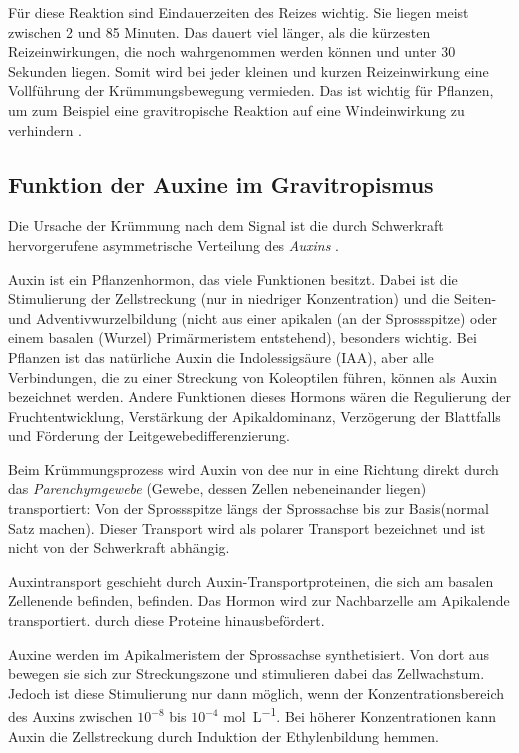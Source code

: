 \documentclass[
11pt, 
ngerman,
listof=totocnumbered,
oneside,
bibliography=totocnumbered,
abstracton
]{scrreprt}
\begin{document}
Für diese Reaktion sind Eindauerzeiten des Reizes wichtig. Sie liegen meist zwischen 2 und 85 Minuten. Das dauert viel länger, als die kürzesten Reizeinwirkungen, die noch wahrgenommen werden können und unter 30 Sekunden liegen. 
Somit wird bei jeder kleinen und kurzen Reizeinwirkung eine Vollführung der Krümmungsbewegung vermieden. Das ist wichtig für Pflanzen, um zum Beispiel eine gravitropische Reaktion auf eine Windeinwirkung zu verhindern \parencite[531]{Luettge}.


\subsection{Funktion der Auxine im Gravitropismus}

Die Ursache der Krümmung nach dem Signal ist die durch Schwerkraft hervorgerufene asymmetrische Verteilung des \emph{Auxins}  \parencite[502--503]{Nultsch}.

Auxin ist ein Pflanzenhormon, das viele Funktionen besitzt. Dabei ist die Stimulierung der Zellstreckung (nur in niedriger Konzentration) und die Seiten- und Adventivwurzelbildung (nicht aus einer apikalen (an der Sprossspitze) oder einem basalen (Wurzel) Primärmeristem entstehend), besonders wichtig. 
Bei Pflanzen ist das natürliche Auxin die Indolessigsäure (IAA), aber alle Verbindungen, die zu einer Streckung von Koleoptilen führen, können als Auxin bezeichnet werden.
Andere Funktionen dieses Hormons wären die Regulierung der Fruchtentwicklung, Verstärkung der Apikaldominanz, Verzögerung der Blattfalls und Förderung der Leitgewebedifferenzierung.

Beim Krümmungsprozess wird Auxin von dee nur in eine Richtung direkt durch das \emph{Parenchymgewebe} (Gewebe, dessen Zellen nebeneinander liegen) transportiert: Von der Sprossspitze längs der Sprossachse bis zur Basis(normal Satz machen). Dieser Transport wird als polarer Transport bezeichnet und ist nicht von der Schwerkraft abhängig.

Auxintransport geschieht durch Auxin-Transportproteinen, die sich am basalen Zellenende befinden, befinden.
Das Hormon wird zur Nachbarzelle am Apikalende transportiert.  durch diese Proteine hinausbefördert.

Auxine werden im Apikalmeristem der Sprossachse synthetisiert. Von dort aus bewegen sie sich zur Streckungszone und stimulieren dabei das Zellwachstum.
Jedoch ist diese Stimulierung nur dann möglich, wenn der Konzentrationsbereich des Auxins zwischen $10^{-8}$ bis $10^{-4}$ \si{\mole\per\L}. Bei höherer Konzentrationen kann Auxin die Zellstreckung durch Induktion der Ethylenbildung hemmen.
\end{document}
